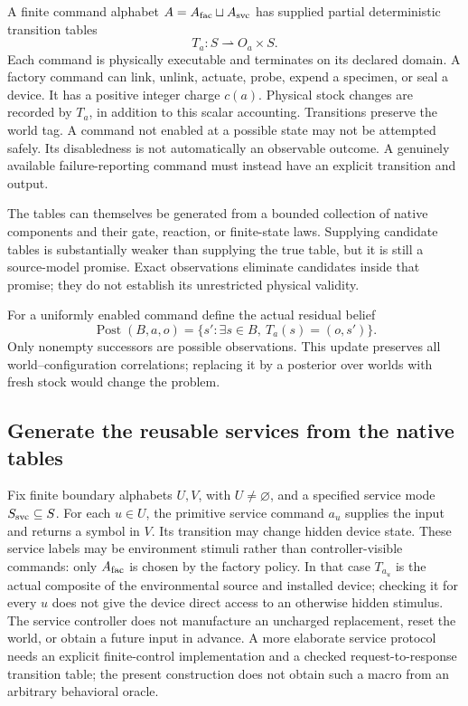 \documentclass[11pt]{article}
\theoremstyle{definition}
\theoremstyle{remark}
\begin{document}
A finite command alphabet $A=A_{\rm fac}\sqcup A_{\rm svc}$ has supplied
partial deterministic transition tables
\[
 T_a:S\rightharpoonup O_a\times S.
\]
Each command is physically executable and terminates on its declared
domain. A factory command can link, unlink, actuate, probe, expend a specimen,
or seal a device. It has a positive integer charge $c(a)$. Physical stock
changes are recorded by $T_a$, in addition to this scalar accounting.
Transitions preserve the world tag. A command not enabled at a possible
state may not be attempted safely. Its disabledness is not automatically
an observable outcome. A genuinely available failure-reporting command
must instead have an explicit transition and output.

The tables can themselves be generated from a bounded collection of native
components and their gate, reaction, or finite-state laws. Supplying candidate
tables is substantially weaker than supplying the true table, but it is
still a source-model promise. Exact observations eliminate candidates inside
that promise; they do not establish its unrestricted physical validity.

For a uniformly enabled command define the actual residual belief
\[
 \operatorname{Post}(B,a,o)=
 \{s':\exists s\in B,\ T_a(s)=(o,s')\}.
\]
Only nonempty successors are possible observations. This update preserves
all world--configuration correlations; replacing it by a posterior over
worlds with fresh stock would change the problem.

\subsection{Generate the reusable services from the native tables}
Fix finite boundary alphabets $U,V$, with $U\ne\varnothing$, and a specified
service mode $S_{\rm svc}\subseteq S$. For each $u\in U$, the primitive service
command $a_u$ supplies the input and returns a symbol in $V$. Its transition
may change hidden device state. These service labels may be environment
stimuli rather than controller-visible commands: only $A_{\rm fac}$ is
chosen by the factory policy. In that case $T_{a_u}$ is the actual composite
of the environmental source and installed device; checking it for every $u$
does not give the device direct access to an otherwise hidden stimulus.
The service controller does not manufacture
an uncharged replacement, reset the world, or obtain a future input in
advance. A more elaborate service protocol needs an explicit finite-control
implementation and a checked request-to-response transition table; the
present construction does not obtain such a macro from an arbitrary
behavioral oracle.
\end{document}
